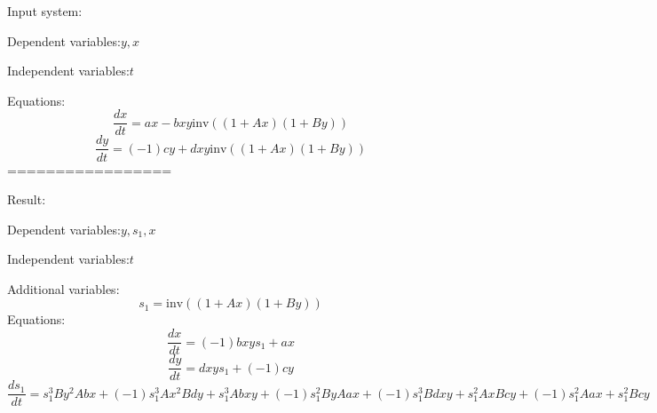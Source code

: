 \documentclass[10pt,a4paper]{article}
\begin{document}
Input system:

Dependent variables:$y, x$

Independent variables:$t$

Equations:
\begin{dmath*}\frac{dx}{dt} = a  x - b  x  y  \text{inv}\left(\left(1 + A  x\right)  \left(1 + B  y\right)\right)\end{dmath*}
\begin{dmath*}\frac{dy}{dt} = \left(-1\right)  c  y + d  x  y  \text{inv}\left(\left(1 + A  x\right)  \left(1 + B  y\right)\right)\end{dmath*}
=================

Result:

Dependent variables:$y, s_{1}, x$

Independent variables:$t$

Additional variables:
\begin{dmath*}s_{1} = \text{inv}\left(\left(1 + A  x\right)  \left(1 + B  y\right)\right)\end{dmath*}
Equations:
\begin{dmath*}\frac{dx}{dt} = \left(-1\right)  b  x  y  s_{1} + a  x\end{dmath*}
\begin{dmath*}\frac{dy}{dt} = d  x  y  s_{1} + \left(-1\right)  c  y\end{dmath*}
\begin{dmath*}\frac{ds_{1}}{dt} = s_{1} ^ {3}  B  y ^ {2}  A  b  x + \left(-1\right)  s_{1} ^ {3}  A  x ^ {2}  B  d  y + s_{1} ^ {3}  A  b  x  y + \left(-1\right)  s_{1} ^ {2}  B  y  A  a  x + \left(-1\right)  s_{1} ^ {3}  B  d  x  y + s_{1} ^ {2}  A  x  B  c  y + \left(-1\right)  s_{1} ^ {2}  A  a  x + s_{1} ^ {2}  B  c  y\end{dmath*}
\end{document}
